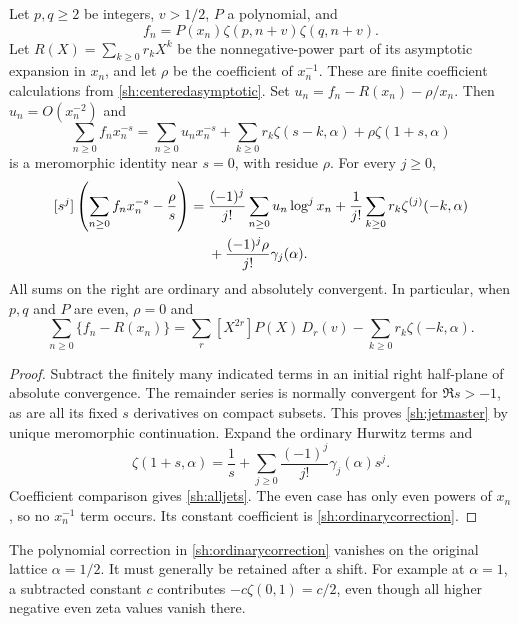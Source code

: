 \begin{theorem}\label{sh:jets}
Let $p,q\ge2$ be integers, $v>1/2$, $P$ a polynomial, and
\[
 f_n=P(x_n)\zeta(p,n+v)\zeta(q,n+v).
\]
Let $R(X)=\sum_{k\ge0}r_kX^k$ be the nonnegative-power part of
its asymptotic expansion in $x_n$, and let $\rho$ be the coefficient
of $x_n^{-1}$.  These are finite coefficient calculations from
\eqref{sh:centeredasymptotic}.  Set
$u_n=f_n-R(x_n)-\rho/x_n$.  Then $u_n=O(x_n^{-2})$ and
\begin{equation}\label{sh:jetmaster}
 \sum_{n\ge0}f_nx_n^{-s}
 =\sum_{n\ge0}u_nx_n^{-s}
       +\sum_{k\ge0}r_k\zeta(s-k,\alpha)
       +\rho\zeta(1+s,\alpha)
\end{equation}
is a meromorphic identity near $s=0$, with residue $\rho$.  For
every $j\ge0$,
\begin{align}\label{sh:alljets}
 [s^j]\left(\sum_{n\ge0}f_nx_n^{-s}-\frac\rho s\right)
 ={}&\frac{(-1)^j}{j!}\sum_{n\ge0}u_n\log^j x_n
     +\frac1{j!}\sum_{k\ge0}r_k\zeta^{(j)}(-k,\alpha)\notag\\
 &+\frac{(-1)^j\rho}{j!}\gamma_j(\alpha).
\end{align}
All sums on the right are ordinary and absolutely convergent.
In particular, when $p,q$ and $P$ are even, $\rho=0$ and
\begin{equation}\label{sh:ordinarycorrection}
 \boxed{\sum_{n\ge0}\{f_n-R(x_n)\}
   =\sum_r[X^{2r}]P(X)\,D_r(v)
                       -\sum_{k\ge0}r_k\zeta(-k,\alpha).}
\end{equation}
\end{theorem}

\begin{proof}
Subtract the finitely many indicated terms in an initial right
half-plane of absolute convergence.  The remainder series is normally
convergent for $\Re s>-1$, as are all its fixed $s$ derivatives
on compact subsets.  This proves \eqref{sh:jetmaster} by unique
meromorphic continuation.  Expand the ordinary Hurwitz terms and
\[
 \zeta(1+s,\alpha)=\frac1s+
       \sum_{j\ge0}\frac{(-1)^j}{j!}\gamma_j(\alpha)s^j.
\]
Coefficient comparison gives \eqref{sh:alljets}.  The even case has
only even powers of $x_n$, so no $x_n^{-1}$ term occurs.  Its
constant coefficient is \eqref{sh:ordinarycorrection}.
\end{proof}

The polynomial correction in \eqref{sh:ordinarycorrection} vanishes
on the original lattice $\alpha=1/2$.  It must generally be retained
after a shift.  For example at $\alpha=1$, a subtracted constant
$c$ contributes $-c\zeta(0,1)=c/2$, even though all higher
negative even zeta values vanish there.

